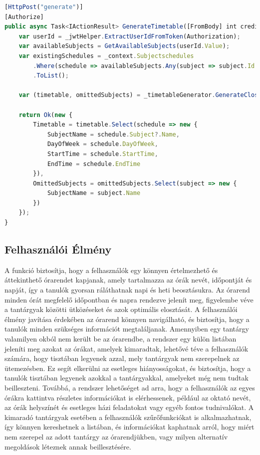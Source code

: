 \documentclass[colorlinks]{thesis-kando}
\theoremstyle{definition}
\theoremstyle{remark}
\begin{document}
\begin{lstlisting}[language=JavaScript]
[HttpPost("generate")]
[Authorize]
public async Task<IActionResult> GenerateTimetable([FromBody] int creditValue, [FromHeader(Name = "Authorization")] string Authorization) {
    var userId = _jwtHelper.ExtractUserIdFromToken(Authorization);
    var availableSubjects = GetAvailableSubjects(userId.Value);
    var existingSchedules = _context.Subjectschedules
        .Where(schedule => availableSubjects.Any(subject => subject.Id == schedule.SubjectId))
        .ToList();

    var (timetable, omittedSubjects) = _timetableGenerator.GenerateClosestTimetable(creditValue, availableSubjects, existingSchedules);

    return Ok(new {
        Timetable = timetable.Select(schedule => new {
            SubjectName = schedule.Subject?.Name,
            DayOfWeek = schedule.DayOfWeek,
            StartTime = schedule.StartTime,
            EndTime = schedule.EndTime
        }),
        OmittedSubjects = omittedSubjects.Select(subject => new {
            SubjectName = subject.Name
        })
    });
}
\end{lstlisting}

\subsection{Felhasználói Élmény}
A funkció biztosítja, hogy a felhasználók egy könnyen értelmezhető és áttekinthető órarendet kapjanak, amely tartalmazza az órák nevét, időpontját és napját, így a tanulók gyorsan ráláthatnak napi és heti beosztásukra. Az órarend minden órát megfelelő időpontban és napra rendezve jelenít meg, figyelembe véve a tantárgyak közötti ütközéseket és azok optimális elosztását. A felhasználói élmény javítása érdekében az órarend könnyen navigálható, és biztosítja, hogy a tanulók minden szükséges információt megtaláljanak. Amennyiben egy tantárgy valamilyen okból nem került be az órarendbe, a rendszer egy külön listában jeleníti meg azokat az órákat, amelyek kimaradtak, lehetővé téve a felhasználók számára, hogy tisztában legyenek azzal, mely tantárgyak nem szerepelnek az ütemezésben. Ez segít elkerülni az esetleges hiányosságokat, és biztosítja, hogy a tanulók tisztában legyenek azokkal a tantárgyakkal, amelyeket még nem tudtak beilleszteni. Továbbá, a rendszer lehetőséget ad arra, hogy a felhasználók az egyes órákra kattintva részletes információkat is elérhessenek, például az oktató nevét, az órák helyszínét és esetleges házi feladatokat vagy egyéb fontos tudnivalókat. A kimaradó tantárgyak esetében a felhasználók szűrőfunkciókat is alkalmazhatnak, így könnyen kereshetnek a listában, és információkat kaphatnak arról, hogy miért nem szerepel az adott tantárgy az órarendjükben, vagy milyen alternatív megoldások léteznek annak beillesztésére.
\end{document}
